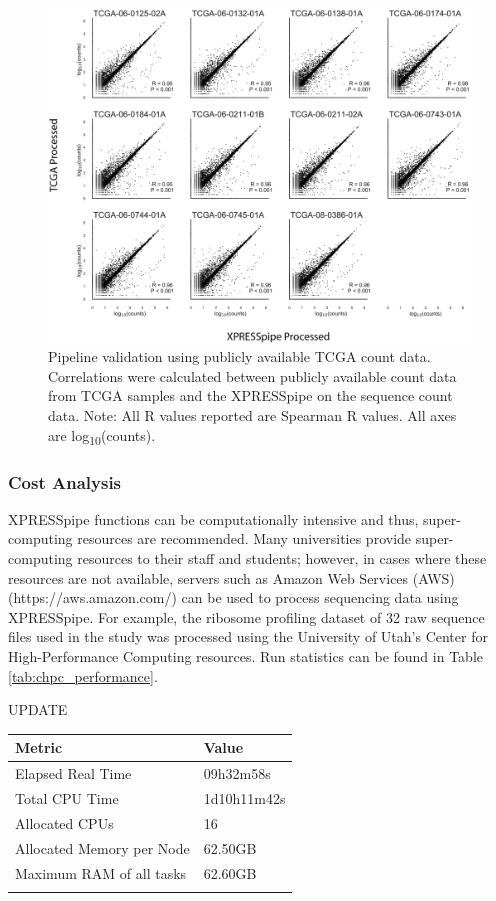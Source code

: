 \documentclass[11pt, a4paper, oneside]{article}
\begin{document}
\begin{figure}
\centering
  \includegraphics[width=180mm]{figures/xpresspipe_figure4.png}
  \caption{Pipeline validation using publicly available TCGA count data. Correlations were calculated between publicly available count data from TCGA samples and the XPRESSpipe on the sequence count data. Note: All R values reported are Spearman R values. All axes are log\textsubscript{10}(counts).}
  \label{fig:figure4}
\end{figure}


\subsubsection{Cost Analysis}
XPRESSpipe functions can be computationally intensive and thus, super-computing resources are recommended. Many universities provide super-computing resources to their staff and students; however, in cases where these resources are not available, servers such as Amazon Web Services (AWS) (https://aws.amazon.com/) can be used to process sequencing data using XPRESSpipe. For example, the ribosome profiling dataset of 32 raw sequence files used in the study was processed using the University of Utah's Center for High-Performance Computing resources. Run statistics can be found in Table \ref{tab:chpc_performance}.

UPDATE
\begin{tabular}{p{5cm}p{3cm}}
\textbf{Metric} & \textbf{Value} \\
\hline
 Elapsed Real Time & 09h32m58s \\
 \hline
 Total CPU Time & 1d10h11m42s \\
 \hline
 Allocated CPUs & 16 \\
 \hline
 Allocated Memory per Node & 62.50GB \\
 \hline
 Maximum RAM of all tasks & 62.60GB \\
 \label{tab:chpc_performance}
\end{tabular}
\newline
\end{document}

